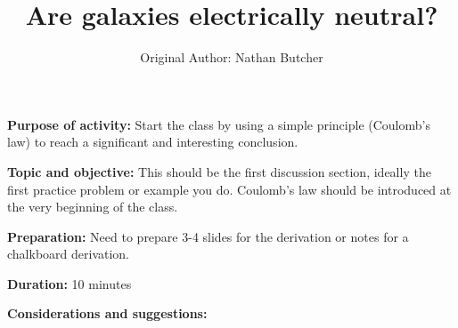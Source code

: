\documentclass{article}
\title{Are galaxies electrically neutral?}
\author{Original Author: Nathan Butcher}
\date{}
\begin{document}
\maketitle
\thispagestyle{empty}

\textbf{Purpose of activity:} Start the class by using a simple principle (Coulomb's law) to reach a significant and interesting conclusion.

\textbf{Topic and objective:} This should be the first discussion section, ideally the first practice problem or example you do. Coulomb's law should be introduced at the very beginning of the class.

\textbf{Preparation:} Need to prepare 3-4 slides for the derivation or notes for a chalkboard derivation.

\textbf{Duration:} 10 minutes 

\textbf{Considerations and suggestions:} 

\hspace{14pt}
\end{document}

